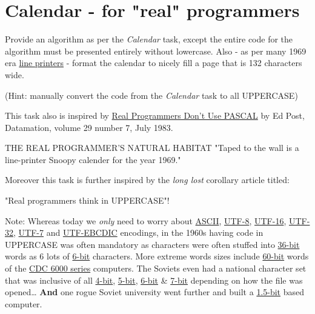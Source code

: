 \pagebreak{}
\section*{Calendar - for "real" programmers}

Provide an algorithm as per the \emph{Calendar} task, except the
entire code for the algorithm must be presented entirely without
lowercase. Also - as per many 1969 era
\href{http://en.wikipedia.org/wiki/line\_printer\#Paper\_.28forms.29\_handling}{line
  printers} - format the calendar to nicely fill a page that is 132
characters wide.

(Hint: manually convert the code from the \emph{Calendar} task to all
UPPERCASE)

This task also is inspired by
\href{http://www.ee.ryerson.ca/~elf/hack/realmen.html}{Real Programmers
Don't Use PASCAL} by Ed Post, Datamation, volume 29 number 7, July 1983.

\begin{wideverbatim}
THE REAL PROGRAMMER'S NATURAL HABITAT
"Taped to the wall is a line-printer Snoopy calender for the year 1969."
\end{wideverbatim}

Moreover this task is further inspired by the \emph{long lost} corollary
article titled:

\begin{wideverbatim}
"Real programmers think in UPPERCASE"!
\end{wideverbatim}

Note: Whereas today we \emph{only} need to worry about
\href{http://en.wikipedia.org/wiki/ASCII}{ASCII},
\href{http://en.wikipedia.org/wiki/UTF-8}{UTF-8},
\href{http://en.wikipedia.org/wiki/UTF-16/UCS-2}{UTF-16},
\href{http://en.wikipedia.org/wiki/UTF-32/UCS-4}{UTF-32},
\href{http://en.wikipedia.org/wiki/UTF-7}{UTF-7} and
\href{http://en.wikipedia.org/wiki/UTF-EBCDIC}{UTF-EBCDIC} encodings, in
the 1960s having code in UPPERCASE was often mandatory as characters
were often stuffed into
\href{http://en.wikipedia.org/wiki/36-bit}{36-bit} words as 6 lots of
\href{http://en.wikipedia.org/wiki/6-bit}{6-bit} characters. More
extreme words sizes include
\href{http://en.wikipedia.org/wiki/60-bit}{60-bit} words of the
\href{http://en.wikipedia.org/wiki/CDC\_6000\_series}{CDC 6000 series}
computers. The Soviets even had a national character set that was
inclusive of all
\href{http://en.wikipedia.org/wiki/GOST\_10859\#4-bit\_code:\_Binary\_coded\_decimal}{4-bit},
\href{http://en.wikipedia.org/wiki/GOST\_10859\#5-bit\_code:\_with\_BCD\_.26\_mathematical\_operators}{5-bit},
\href{http://en.wikipedia.org/wiki/GOST\_10859\#6-bit\_code:\_with\_only\_Cyrillic\_upper\_case\_letters}{6-bit}
\&
\href{http://en.wikipedia.org/wiki/GOST\_10859\#7-bit\_code:\_Cyrillic\_.26\_Latin\_upper\_case\_letters}{7-bit}
depending on how the file was opened\ldots{} \textbf{And} one rogue
Soviet university went further and built a
\href{http://www.computer-museum.ru/english/setun.htm}{1.5-bit} based
computer.

